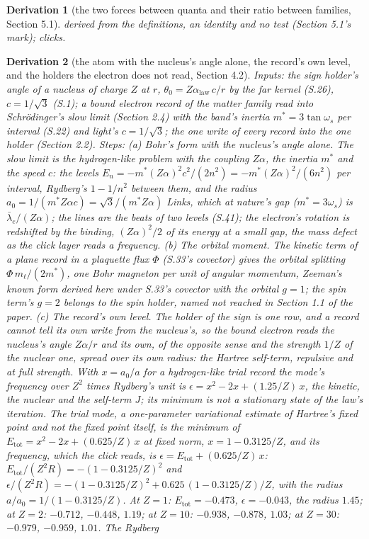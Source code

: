 \documentclass[pdflatex,sn-mathphys-num]{sn-jnl}
\theoremstyle{thmstyleone}
\newtheorem{derivation}{Derivation}
\begin{document}
\begin{derivation}[the two forces between quanta and their ratio between families, Section 5.1]
derived from the definitions, an identity and no test (Section 5.1's mark); clicks.
\end{derivation}




\begin{derivation}[the atom with the nucleus's angle alone, the record's own level, and the holders the electron does not read, Section 4.2]
\emph{Inputs:} the sign holder's angle of a nucleus of charge $Z$ at $r$, $\theta_0 = Z\alpha_{\mathrm{law}}\,c / r$ by the far kernel (S.26), $c = 1 / \sqrt 3$ (S.1); a bound electron record of the matter family read into Schr\"odinger's slow limit (Section 2.4) with the band's inertia $m^* = 3\tan\omega_s$ per interval (S.22) and light's $c = 1 / \sqrt 3$; the one write of every record into the one holder (Section 2.2). \emph{Steps:} (a) \emph{Bohr's form with the nucleus's angle alone.} The slow limit is the hydrogen-like problem with the coupling $Z\alpha$, the inertia $m^*$ and the speed $c$: the levels $E_n = -m^*(Z\alpha)^2 c^2 / (2n^2) = -m^*(Z\alpha)^2 / (6n^2)$ per interval, Rydberg's $1 - 1 / n^2$ between them, and the radius $a_0 = 1 / (m^* Z\alpha c) = \sqrt 3 / (m^* Z\alpha)$ Links, which at nature's gap ($m^* = 3\omega_s$) is $\bar\lambda_e / (Z\alpha)$; the lines are the beats of two levels (S.41); the electron's rotation is redshifted by the binding, $(Z\alpha)^2 / 2$ of its energy at a small gap, the mass defect as the click layer reads a frequency. (b) \emph{The orbital moment.} The kinetic term of a plane record in a plaquette flux $\Phi$ (S.33's covector) gives the orbital splitting $\Phi\,m_\ell / (2m^*)$, one Bohr magneton per unit of angular momentum, Zeeman's known form derived here under S.33's covector with the orbital $g = 1$; the spin term's $g = 2$ belongs to the spin holder, named not reached in Section 1.1 of the paper. (c) \emph{The record's own level.} The holder of the sign is one row, and a record cannot tell its own write from the nucleus's, so the bound electron reads the nucleus's angle $Z\alpha / r$ and its own, of the opposite sense and the strength $1 / Z$ of the nuclear one, spread over its own radius: the Hartree self-term, repulsive and at full strength. With $x = a_0 / a$ for a hydrogen-like trial record the mode's frequency over $Z^2$ times Rydberg's unit is $\epsilon = x^2 - 2x + (1.25 / Z)\,x$, the kinetic, the nuclear and the self-term $J$; its minimum is not a stationary state of the law's iteration. The trial mode, a one-parameter variational estimate of Hartree's fixed point and not the fixed point itself, is the minimum of $E_{\mathrm{tot}} = x^2 - 2x + (0.625 / Z)\,x$ at fixed norm, $x = 1 - 0.3125 / Z$, and its frequency, which the click reads, is $\epsilon = E_{\mathrm{tot}} + (0.625 / Z)\,x$: $E_{\mathrm{tot}} / (Z^2 R) = -(1 - 0.3125 / Z)^2$ and $\epsilon / (Z^2 R) = -(1 - 0.3125 / Z)^2 + 0.625\,(1 - 0.3125 / Z) / Z$, with the radius $a / a_0 = 1 / (1 - 0.3125 / Z)$. At $Z = 1$: $E_{\mathrm{tot}} = -0.473$, $\epsilon = -0.043$, the radius $1.45$; at $Z = 2$: $-0.712$, $-0.448$, $1.19$; at $Z = 10$: $-0.938$, $-0.878$, $1.03$; at $Z = 30$: $-0.979$, $-0.959$, $1.01$. The Rydberg 
\end{derivation}
\end{document}

